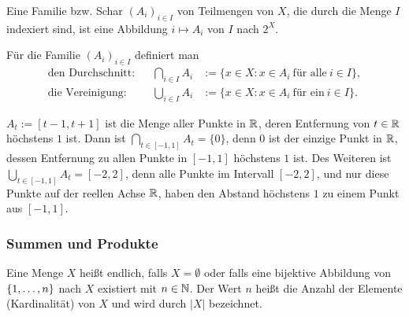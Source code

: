 Eine Familie bzw. Schar  $ (A_i)_{i \in I}$ von Teilmengen von $ X $, die durch die Menge $I$ indexiert sind,  ist eine Abbildung $i \mapsto A_i$ von $I$ nach $2^X$. 

Für die Familie $ (A_i)_{i \in I} $ definiert man
\begin{align*}
	\text{den Durchschnitt:} && \bigcap_{i \in I} A_i &:= \{ x \in X : x \in A_i \:\text{für alle}\: i \in I \},\\
	\text{die Vereinigung:} && \bigcup_{i \in I} A_i &:= \{ x \in X : x \in A_i \:\text{für ein}\: i \in I \}.
\end{align*}

\begin{bsp}
	 $A_t := [t-1,t+1]$ ist die Menge aller Punkte in $\mathbb R$, deren Entfernung von $t \in \mathbb R$ höchstens $1$ ist. Dann ist $\bigcap_{t \in [-1,1]} A_t = \{0\}$, denn $0$ ist der einzige Punkt in $\mathbb R$, dessen Entfernung zu allen Punkte in $[-1,1]$ höchstens $1$ ist. Des Weiteren ist $\bigcup_{t \in [-1,1]} A_t = [-2,2]$, denn alle Punkte im Intervall $[-2,2]$, und nur diese Punkte auf der reellen Achse $\mathbb R$, haben den Abstand höchstens $1$ zu einem Punkt aus $[-1,1]$. 
\end{bsp} 


\subsubsection{Summen und Produkte}

Eine Menge $ X $ heißt endlich, falls $ X = \emptyset $ oder falls eine bijektive Abbildung von $ \{ 1,\ldots,n \} $ nach $ X $ existiert mit $ n \in \mathbb N $. Der Wert $ n $ heißt die Anzahl der Elemente (Kardinalität) von $ X $ und wird durch $ |X| $ bezeichnet.

